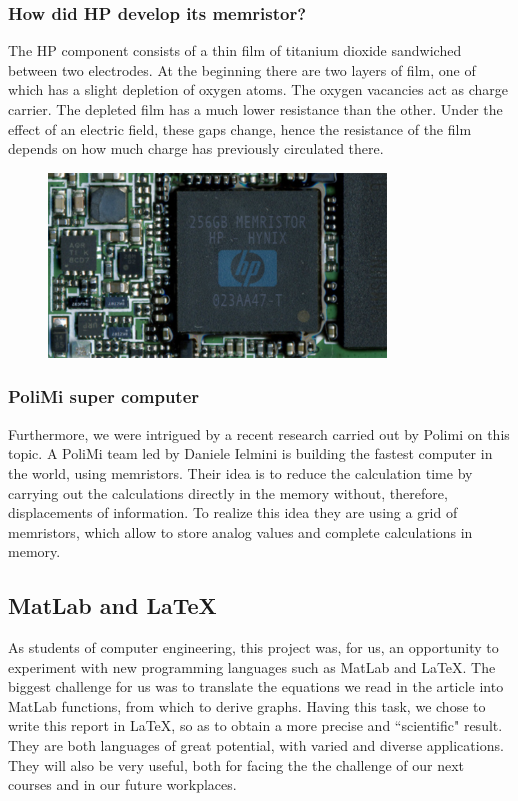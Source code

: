 \documentclass[12pt, a4paper]{paper}
\begin{document}
\subsubsection{How did HP develop its memristor?}
The HP component consists of a thin film of titanium dioxide sandwiched between two electrodes.
At the beginning there are two layers of film, one of which has a slight depletion of oxygen atoms. The oxygen vacancies act as charge carrier. The depleted film has a much lower resistance than the other. 
Under the effect of an electric field,  these gaps change, hence the resistance of the film depends on how much charge has previously circulated there.

\begin{figure}[h]
\centering
\includegraphics[width=0.8\textwidth]{Hp_memristor_1.eps}
\end{figure}

\subsubsection{PoliMi super computer}
Furthermore, we were intrigued by a recent research carried out by Polimi on this topic.
A PoliMi team led by Daniele Ielmini is building the fastest computer in the world, using memristors.
Their idea is to reduce the calculation time by carrying out the calculations directly in the memory
without, therefore, displacements of information.
To realize this idea they are using a grid of memristors, which allow to store analog values and complete calculations in memory.

\subsection{MatLab and LaTeX}
As students of computer engineering, this project was, for us, an opportunity to
experiment with new programming languages such as MatLab and LaTeX.
The biggest challenge for us was to translate the equations we read in the article into  MatLab functions, from which to derive graphs.
Having this task,  we chose to write this report in LaTeX, so as to obtain a 
more precise and “scientific" result.
They are both languages of great potential, with varied and diverse applications.
They will also be very useful, both for facing the the challenge of our next courses and in our future workplaces.
\end{document}
